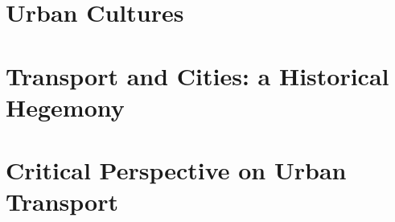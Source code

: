 \documentclass{article}
\begin{document}
\textbf{}

\textbf{}

\pagebreak\section{Urban Cultures}

\textbf{}

\textbf{}

\textbf{}

\textbf{}

\textbf{}

\textbf{}

\textbf{}

\textbf{}

\textbf{}

\pagebreak\section{Transport and Cities: a Historical Hegemony}

\textbf{}

\textbf{}

\textbf{}

\textbf{}

\textbf{}

\textbf{}

\textbf{}

\textbf{}

\textbf{}

\pagebreak\section{Critical Perspective on Urban Transport}

\textbf{}

\textbf{}

\textbf{}

\textbf{}

\textbf{}

\textbf{}

\textbf{}

\textbf{}

\textbf{}
\end{document}
